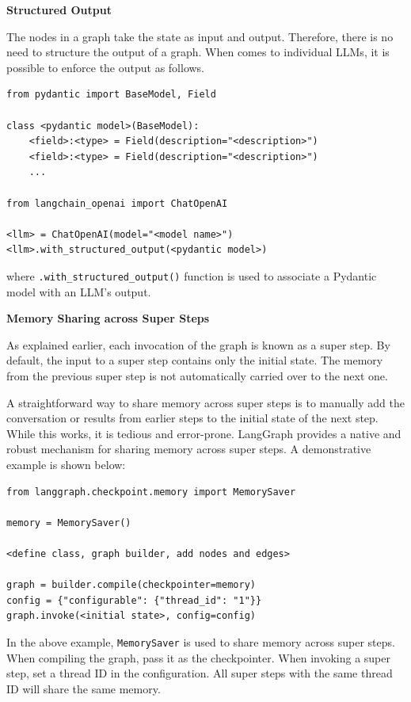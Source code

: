 \vspace{0.1in}
\noindent \textbf{Structured Output}
\vspace{0.1in}

The nodes in a graph take the state as input and output. Therefore, there is no need to structure the output of a graph. When comes to individual LLMs, it is possible to enforce the output as follows.
\begin{lstlisting}
from pydantic import BaseModel, Field

class <pydantic model>(BaseModel):
    <field>:<type> = Field(description="<description>")
    <field>:<type> = Field(description="<description>")
    ...

from langchain_openai import ChatOpenAI

<llm> = ChatOpenAI(model="<model name>")
<llm>.with_structured_output(<pydantic model>)
\end{lstlisting}
where \verb|.with_structured_output()| function is used to associate a Pydantic model with an LLM's output.

\vspace{0.1in}
\noindent \textbf{Memory Sharing across Super Steps}
\vspace{0.1in}

As explained earlier, each invocation of the graph is known as a super step. By default, the input to a super step contains only the initial state. The memory from the previous super step is not automatically carried over to the next one. 

A straightforward way to share memory across super steps is to manually add the conversation or results from earlier steps to the initial state of the next step. While this works, it is tedious and error-prone. LangGraph provides a native and robust mechanism for sharing memory across super steps. A demonstrative example is shown below:
\begin{lstlisting}
from langgraph.checkpoint.memory import MemorySaver

memory = MemorySaver()

<define class, graph builder, add nodes and edges>

graph = builder.compile(checkpointer=memory)
config = {"configurable": {"thread_id": "1"}}
graph.invoke(<initial state>, config=config)
\end{lstlisting}

In the above example, \texttt{MemorySaver} is used to share memory across super steps. When compiling the graph, pass it as the checkpointer. When invoking a super step, set a thread ID in the configuration. All super steps with the same thread ID will share the same memory.

